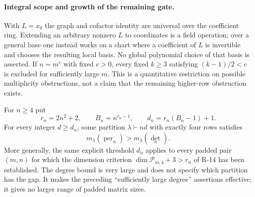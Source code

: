\paragraph{Integral scope and growth of the remaining gate.}
With $L=x_0$ the graph and cofactor identity are universal over the coefficient ring. Extending an arbitrary nonzero $L$ to coordinates is a field operation; over a general base one instead works on a chart where a coefficient of $L$ is invertible and chooses the resulting local basis. No global polynomial choice of that basis is asserted. If $n=m^c$ with fixed $c>0$, every fixed $k\geq3$ satisfying $(k-1)/2<c$ is excluded for sufficiently large $m$. This is a quantitative restriction on possible multiplicity obstructions, not a claim that the remaining higher-row obstruction exists.
\begin{proposition}\label{G-10}
For $n\geq4$ put
\[
 r_n=2n^2+2,\qquad B_n=n^{r_n-1},\qquad
 d_n=r_n(B_n-1)+1.
\]
For every integer $d\geq d_n$, some partition $\lambda\vdash nd$
with exactly four rows satisfies
\[
 m_\lambda(\operatorname{per}_n)>m_\lambda(\det_n).
\]
More generally, the same explicit threshold $d_n$ applies to every
padded pair $(m,n)$ for which the dimension criterion
$\dim\mathcal P_{m,4}+3>r_n$ of R-14 has been established.
The degree bound is very large and does not specify which partition
has the gap. It makes the preceding ``sufficiently large degree''
assertions effective; it gives no larger range of padded matrix sizes.
\end{proposition}
